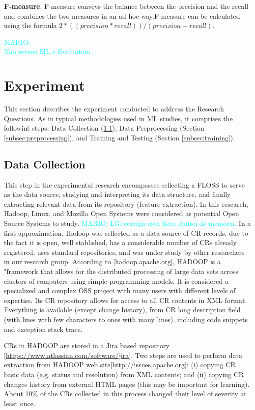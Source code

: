 \documentclass[10pt, conference]{IEEEtran}
\newcommand{\mario}[1]{\noindent\textcolor{cyan}{MARIO: {#1}}}
\newcommand{\mario}[1]{}
\begin{document}
\textbf{F-measure}. F-measure conveys the balance between the precision and the recall and combines the two measures in an ad hoc way\cite{Feldman2007, Zhao2013}.F-measure can be calculated using the formula $2*((precision*recall))/(precision+recall)$. 

\mario{\\Nao revisei ML e Evaluation}

\section{Experiment} \label{sec:experiment}
This section describes the experiment conducted to address the Research Questions. As in typical methodologies used in ML studies, it comprises the followint steps: Data Collection (\ref{subsec:collection}), Data Preprocessing (Section \ref{subsec:preprocessing}), and Training and Testing (Section \ref{subsec:training}).

\subsection{Data Collection} 	\label{subsec:collection}
This step in the experimental research encompasses sellecting a FLOSS to serve as the data source, studying and interpreting its data structure, and finally extracting relevant data from its repository (feature extraction). In this research, Hadoop, Linux, and Mozilla Open Systems were considered as potential Open Source Systems to study. \mario{LG: corrigir esta lista; chutei de memoria.} In a first approximation, Hadoop was sellected as a data source of CR records, due to the fact it is open, well stablished, has a considerable number of CRs already registered, uses standard repositories, and was under study by other researchers in our research group. According to [hadoop.apache.org], HADOOP is a "framework that allows for the distributed processing of large data sets across clusters of computers using simple programming models. It is considered a specialized and complex OSS project with many users with different levels of expertise. Its CR repository allows for access to all CR contents in XML format. Everything is available (except change history), from CR long description field (with lines with few characters to ones with many lines), including code snippets and exception stack trace.

CRs in HADOOP are stored in a Jira based repository [\url{https://www.atlassian.com/software/jira}]. Two steps are used to perform data extraction from HADOOP web site[\url{http://issues.apache.org}]: (i) copying CR basic data (e.g. status and resolution) from XML contents; and (ii) copying CR changes history from external HTML pages (this may be important for learning). About 10\% of the CRs collected in this process changed their level of severity at least once.
\end{document}

